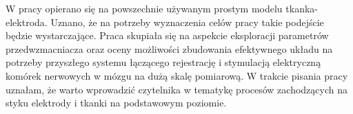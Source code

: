 \begin{frame}[t]

    \begin{block}{\tb}
    \end{block}
    W pracy opierano się na powszechnie używanym prostym modelu tkanka-elektroda. 
    Uznano, że na potrzeby wyznaczenia celów pracy takie podejście będzie wystarczające. 
    Praca skupiała się na aspekcie eksploracji parametrów przedwzmacniacza oraz oceny możliwości zbudowania efektywnego układu na potrzeby przyszłego systemu łączącego rejestrację i stymulacją elektryczną komórek nerwowych w mózgu na dużą skalę pomiarową.
    W trakcie pisania pracy uznałam, że warto wprowadzić czytelnika w tematykę procesów zachodzących na styku elektrody i tkanki na podstawowym poziomie. 

\end{frame}

